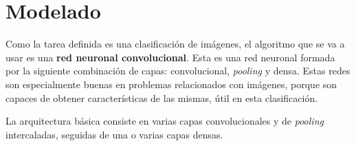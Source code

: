 \documentclass{uc3mpracticas}
\begin{document}
    \newpage

  \section{Modelado}

  Como la tarea definida es una clasificación de imágenes, el algoritmo que se va a usar es una \textbf{red neuronal convolucional}. Esta es una red neuronal formada por la siguiente combinación de capas: convolucional, \textit{pooling} y densa. Estas redes son especialmente buenas en problemas relacionados con imágenes, porque son capaces de obtener características de las mismas, útil en esta clasificación.

  \vspace{3mm}

  La arquitectura básica consiste en varias capas convolucionales y de \textit{pooling} intercaladas, seguidas de una o varias capas densas.
\end{document}
